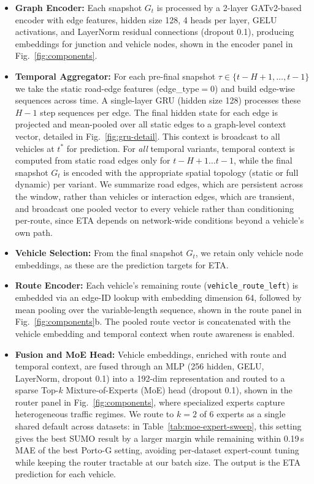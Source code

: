 \documentclass[pdflatex,sn-basic,Numbered]{sn-jnl}%
\begin{document}
\begin{itemize}
    \item \textbf{Graph Encoder:} Each snapshot $G_t$ is processed by a 2-layer GATv2-based encoder with edge features, hidden size 128, 4 heads per layer, GELU activations, and LayerNorm residual connections (dropout 0.1), producing embeddings for junction and vehicle nodes, shown in the encoder panel in Fig.~\ref{fig:components}.
    \item \textbf{Temporal Aggregator:} For each pre-final snapshot $\tau\in\{t{-}H{+}1,\ldots,t{-}1\}$ we take the static road-edge features (edge\_type$=0$) and build edge-wise sequences across time. A single-layer GRU (hidden size 128) processes these $H{-}1$ step sequences per edge. The final hidden state for each edge is projected and mean-pooled over all static edges to a graph-level context vector, detailed in Fig.~\ref{fig:gru-detail}. This context is broadcast to all vehicles at $t^*$ for prediction. For \emph{all} temporal variants, temporal context is computed from static road edges only for $t{-}H{+}1\ldots t{-}1$, while the final snapshot $G_t$ is encoded with the appropriate spatial topology (static or full dynamic) per variant. We summarize road edges, which are persistent across the window, rather than vehicles or interaction edges, which are transient, and broadcast one pooled vector to every vehicle rather than conditioning per-route, since ETA depends on network-wide conditions beyond a vehicle's own path.
    \item \textbf{Vehicle Selection:} From the final snapshot $G_t$, we retain only vehicle node embeddings, as these are the prediction targets for ETA.
    \item \textbf{Route Encoder:} Each vehicle's remaining route (\texttt{vehicle\_route\_left}) is embedded via an edge-ID lookup with embedding dimension 64, followed by mean pooling over the variable-length sequence, shown in the route panel in Fig.~\ref{fig:components}b. The pooled route vector is concatenated with the vehicle embedding and temporal context when route awareness is enabled.
    \item \textbf{Fusion and MoE Head:} Vehicle embeddings, enriched with route and temporal context, are fused through an MLP (256 hidden, GELU, LayerNorm, dropout 0.1) into a 192-dim representation and routed to a sparse Top-$k$ Mixture-of-Experts (MoE) head (dropout 0.1), shown in the router panel in Fig.~\ref{fig:components}, where specialized experts capture heterogeneous traffic regimes. We route to $k{=}2$ of 6 experts as a single shared default across datasets: in Table~\ref{tab:moe-expert-sweep}, this setting gives the best SUMO result by a larger margin while remaining within 0.19\,s MAE of the best Porto-G setting, avoiding per-dataset expert-count tuning while keeping the router tractable at our batch size. The output is the ETA prediction for each vehicle.
\end{itemize}
\end{document}
